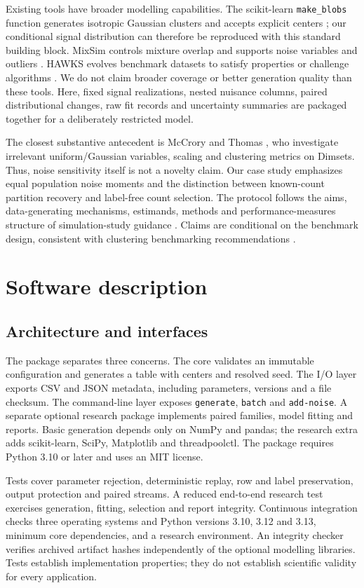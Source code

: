\documentclass[preprint,12pt]{elsarticle}
\begin{document}
Existing tools have broader modelling capabilities. The scikit-learn
\texttt{make\_blobs} function generates isotropic Gaussian clusters and accepts
explicit centers \cite{makeblobs,sklearn}; our conditional signal distribution
can therefore be reproduced with this standard building block. MixSim controls
mixture overlap and supports noise variables and outliers \cite{mixsim}.
HAWKS evolves benchmark datasets to satisfy properties or challenge algorithms
\cite{hawks}. We do not claim broader coverage or better generation quality
than these tools. Here, fixed signal realizations, nested nuisance columns,
paired distributional changes, raw fit records and uncertainty summaries are
packaged together for a deliberately restricted model.

The closest substantive antecedent is McCrory and Thomas \cite{mccrory2024},
who investigate irrelevant uniform/Gaussian variables, scaling and clustering
metrics on Dimsets. Thus, noise sensitivity itself is not a novelty claim.
Our case study emphasizes equal population noise moments and the distinction
between known-count partition recovery and label-free count selection.
The protocol follows the aims, data-generating mechanisms, estimands, methods
and performance-measures structure of simulation-study guidance
\cite{morris2019}. Claims are conditional on the benchmark design, consistent
with clustering benchmarking recommendations \cite{vanmechelen2023}.

\section{Software description}
\subsection{Architecture and interfaces}
The package separates three concerns. The core validates an immutable
configuration and generates a table with centers and resolved seed. The I/O
layer exports CSV and JSON metadata, including parameters, versions and a file
checksum. The command-line layer exposes \texttt{generate}, \texttt{batch} and
\texttt{add-noise}. A separate optional research package implements paired
families, model fitting and reports. Basic generation depends only on NumPy
and pandas; the research extra adds scikit-learn, SciPy, Matplotlib and
threadpoolctl. The package requires Python 3.10 or later and uses an MIT license.

Tests cover parameter rejection, deterministic replay, row and label
preservation, output protection and paired streams. A reduced end-to-end
research test exercises generation, fitting, selection and report integrity.
Continuous integration checks three operating systems and Python versions
3.10, 3.12 and 3.13, minimum core dependencies, and a research environment.
An integrity checker verifies archived artifact hashes independently of the
optional modelling libraries. Tests establish implementation properties;
they do not establish scientific validity for every application.
\end{document}
